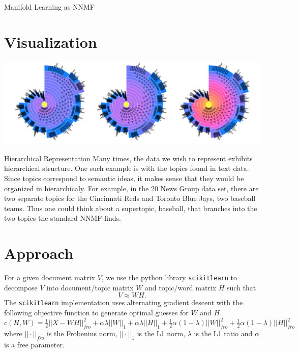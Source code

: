 \documentclass[12pt]{pom_thesis}
\begin{document}
\begin{chapter}{Manifold Learning as NNMF}
	\section{Visualization}
\begin{center}
	\includegraphics[width=7	in]{semi-viz}
\end{center}
\end{chapter}
\begin{chapter}{Hierarchical Representation}
Many times, the data we wish to represent exhibits hierarchical structure. One such example is with the topics found in text data. Since topics correspond to semantic ideas, it makes sense that they would be organized in hierarchicaly. For example, in the 20 News Group data set, there are two separate topics for the Cincinnati Reds and Toronto Blue Jays, two baseball teams. Thus one could think about a supertopic, baseball, that branches into the two topics the standard NNMF finds.
\section{Approach}
For a given document matrix $V$, we use the python library \texttt{scikitlearn} to decompose $V$ into document/topic matrix $W$ and topic/word matrix $H$ such that $$V \approx WH.$$ The  \texttt{scikitlearn} implementation uses alternating gradient descent with the following objective function to generate optimal guesses for $W$ and $H$.
$$c(H,W) = \tfrac{1}{2} ||X-WH||_{fro}^2 + \alpha \lambda ||W||_1 + \alpha \lambda ||H||_1 + \tfrac{1}{2} \alpha (1-\lambda) ||W||^2_{fro} + \tfrac{1}{2} \alpha (1-\lambda) ||H||^2_{fro}  $$
where $||\cdot||_{fro}$ is the Frobenius norm, $||\cdot||_{1}$ is the L1 norm, $\lambda$ is the L1 ratio and $\alpha$ is a free parameter. 


\end{chapter}
\end{document}
